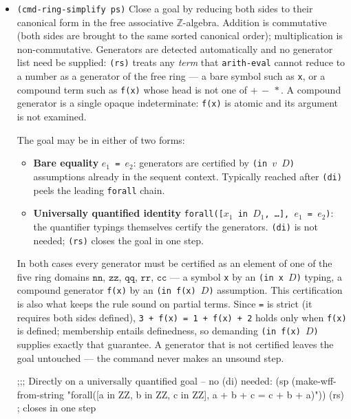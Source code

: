 \begin{itemize}
\item \texttt{(cmd-ring-simplify ps)}
  Close a goal by reducing both sides to their canonical form in the free
  associative $\mathbb{Z}$-algebra.  Addition is commutative (both sides
  are brought to the same sorted canonical order); multiplication is
  non-commutative.  Generators are detected automatically and no generator
  list need be supplied: \texttt{(rs)} treats any \emph{term} that
  \texttt{arith-eval} cannot reduce to a number as a generator of the free
  ring --- a bare symbol such as \texttt{x}, or a compound term such as
  \texttt{f(x)} whose head is not one of $+\,-\,*$.  A compound generator is
  a single opaque indeterminate: \texttt{f(x)} is atomic and its argument is
  not examined.

  The goal may be in either of two forms:
  \begin{itemize}
  \item \textbf{Bare equality} \texttt{$e_1$ = $e_2$}: generators are
    certified by \texttt{(in $v$ $D$)} assumptions already in the sequent
    context.  Typically reached after \texttt{(di)} peels the leading
    \texttt{forall} chain.
  \item \textbf{Universally quantified identity}
    \texttt{forall([$x_1$ in $D_1$, \ldots], $e_1$ = $e_2$)}: the
    quantifier typings themselves certify the generators.  \texttt{(di)}
    is not needed; \texttt{(rs)} closes the goal in one step.
  \end{itemize}

  In both cases every generator must be certified as an element of one of
  the five ring domains $\mathtt{nn}$, $\mathtt{zz}$, $\mathtt{qq}$,
  $\mathtt{rr}$, $\mathtt{cc}$ --- a symbol \texttt{x} by an
  \texttt{(in x $D$)} typing, a compound generator \texttt{f(x)} by an
  \texttt{(in f(x) $D$)} assumption.  This certification is also what keeps
  the rule sound on partial terms.  Since \texttt{=} is strict (it requires
  both sides defined), \texttt{3 + f(x) = 1 + f(x) + 2}
  holds only when \texttt{f(x)} is defined; membership entails definedness,
  so demanding \texttt{(in f(x) $D$)} supplies exactly that guarantee.  A
  generator that is not certified leaves the goal untouched --- the command
  never makes an unsound step.

  \begin{VNBcode}
;;; Directly on a universally quantified goal -- no (di) needed:
(sp (make-wff-from-string
  "forall([a in ZZ, b in ZZ, c in ZZ], a + b + c = c + b + a)"))
(rs)    ; closes in one step


\end{VNBcode}
\end{itemize}
